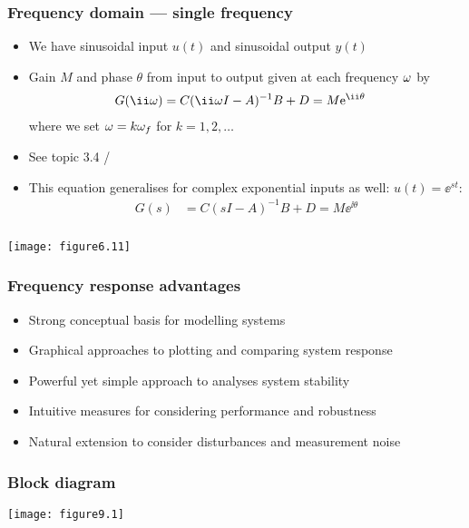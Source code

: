 \documentclass{beamer-control}
\begin{document}
\begin{frame}
\frametitle{Frequency domain --- single frequency}
\begin{itemize}
\item We have sinusoidal input $u(t)$ and sinusoidal output $y(t)$
\item Gain $M$ and phase $\theta$ from input to output given at each frequency $\omega$ by
\begin{align}
G(\ii\ww) &= C(\ii\ww I - A)^{-1}B + D = M\ee^{\ii\theta}
\end{align}
where we set $\omega=k \omega_f$ for $k=1,2,\dots$
\item See topic 3.4 / 
\item \alert{This equation generalises for complex exponential inputs as well: $u(t) = \ee^{st}$:
\begin{align}
G(s) &= C(s I - A)^{-1}B + D = M\ee^{\ii\theta}
\end{align}
}
\end{itemize}

\end{frame}

\begin{frame}
\frametitle{}
\texttt{[image: figure6.11]}

\end{frame}

\begin{frame}
\frametitle{Frequency response advantages}

\begin{itemize}
\item Strong conceptual basis for modelling systems
\item Graphical approaches to plotting and comparing system response
\item Powerful yet simple approach to analyses system stability
\item Intuitive measures for considering performance and robustness
\item Natural extension to consider disturbances and measurement noise
\end{itemize}

\end{frame}

\begin{frame}
\frametitle{Block diagram}

\texttt{[image: figure9.1]}


\end{frame}
\end{document}
